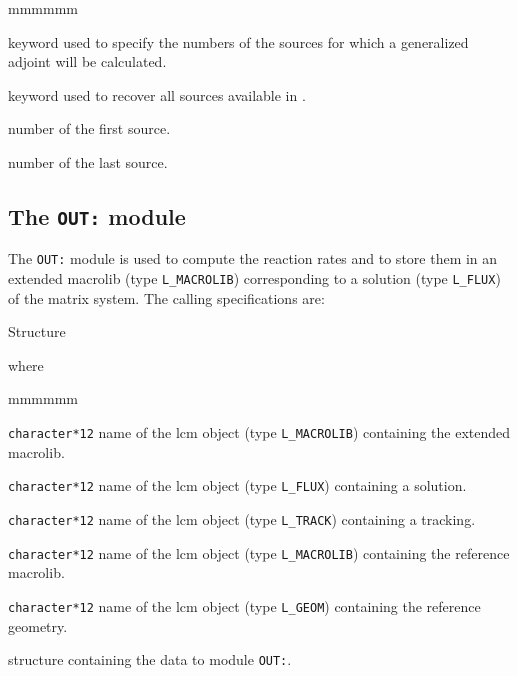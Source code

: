 \begin{ListeDeDescription}{mmmmmm}
\item[\moc{FROM-TO}] keyword used to specify the numbers of the sources for which a generalized adjoint will be calculated.

\item[\moc{ALL}] keyword used to recover all sources available in .

\item[\dusa{$i_{src1}$}] number of the first source.

\item[\dusa{$i_{src1}$}] number of the last source.

\end{ListeDeDescription}
\clearpage

\subsection{The {\tt OUT:} module}

The {\tt OUT:} module is used to compute the reaction rates and to store them in an extended {\sc macrolib} (type {\tt L\_MACROLIB}) corresponding to a solution (type {\tt L\_FLUX}) of the matrix system. The calling specifications are:

\begin{DataStructure}{Structure }
 \moc{:=}      \moc{::} 
\end{DataStructure}

\noindent where
\begin{ListeDeDescription}{mmmmmm}

\item[\dusa{MACRO2}] {\tt character*12} name of the {\sc lcm} object (type {\tt L\_MACROLIB}) containing the extended {\sc macrolib}.

\item[\dusa{FLUX}] {\tt character*12} name of the {\sc lcm} object (type {\tt L\_FLUX}) containing a solution.

\item[\dusa{TRACK}] {\tt character*12} name of the {\sc lcm} object (type {\tt L\_TRACK}) containing a {\sc tracking}.

\item[\dusa{MACRO}] {\tt character*12} name of the {\sc lcm} object (type {\tt L\_MACROLIB}) containing the reference {\sc macrolib}.

\item[\dusa{GEOM}] {\tt character*12} name of the {\sc lcm} object (type {\tt L\_GEOM}) containing the reference {\sc geometry}.

\item[\dstr{out\_data}] structure containing the data to module {\tt OUT:}\label{sect:out_data}.

\end{ListeDeDescription}

